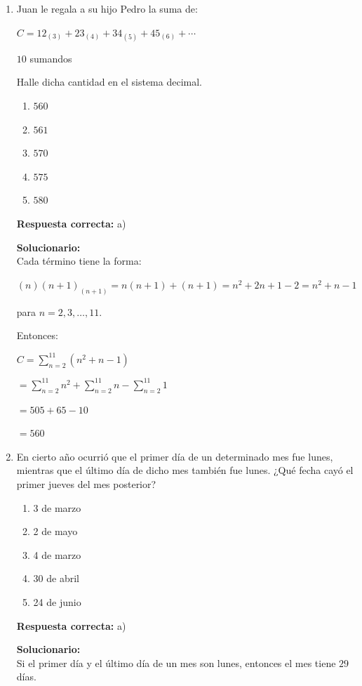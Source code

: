 \begin{enumerate}
	
	\item Juan le regala a su hijo Pedro la suma de:
	
	$C=12_{(3)}+23_{(4)}+34_{(5)}+45_{(6)}+\cdots$
	
	$10$ sumandos
	
	Halle dicha cantidad en el sistema decimal.
	\begin{enumerate}[label=\alph*)]
		\item $560$
		\item $561$
		\item $570$
		\item $575$
		\item $580$
	\end{enumerate}
	\textbf{Respuesta correcta:} a)
	
	\vspace{2mm}
	\textbf{Solucionario:}\\
	Cada término tiene la forma:
	
	$(n)(n+1)_{(n+1)}=n(n+1)+(n+1)=n^2+2n+1-2=n^2+n-1$
	
	para $n=2,3,\dots,11$.
	
	Entonces:
	
	$C=\sum_{n=2}^{11}(n^2+n-1)$
	
	$=\sum_{n=2}^{11}n^2+\sum_{n=2}^{11}n-\sum_{n=2}^{11}1$
	
	$=505+65-10$
	
	$=560$
	
	
	\vspace{6mm}
	
	\item En cierto año ocurrió que el primer día de un determinado mes fue lunes, mientras que el último día de dicho mes también fue lunes. ¿Qué fecha cayó el primer jueves del mes posterior?
	\begin{enumerate}[label=\alph*)]
		\item 3 de marzo
		\item 2 de mayo
		\item 4 de marzo
		\item 30 de abril
		\item 24 de junio
	\end{enumerate}
	\textbf{Respuesta correcta:} a)
	
	\vspace{2mm}
	\textbf{Solucionario:}\\
	Si el primer día y el último día de un mes son lunes, entonces el mes tiene $29$ días.
	

\end{enumerate}
